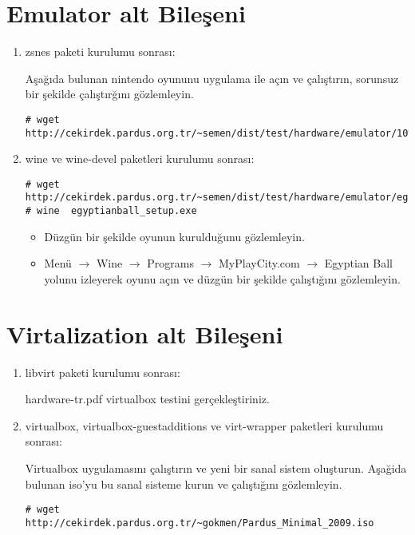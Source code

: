 \documentclass[a4paper,10pt]{article}
\begin{document}
\section{Emulator alt Bileşeni}
\begin{enumerate}
 \item zsnes paketi kurulumu sonrası:

Aşağıda bulunan nintendo oyununu uygulama ile açın ve çalıştırın, sorunsuz bir şekilde çalıştırğını gözlemleyin.
\begin{verbatim}
# wget http://cekirdek.pardus.org.tr/~semen/dist/test/hardware/emulator/10%20Yard%20Fight%20(A&S%20NES%20Hack).smc 
\end{verbatim}

 \item wine ve wine-devel paketleri kurulumu sonrası:
\begin{verbatim}
# wget http://cekirdek.pardus.org.tr/~semen/dist/test/hardware/emulator/egyptianball_setup.exe
# wine  egyptianball_setup.exe
\end{verbatim}
\begin{itemize}
 \item Düzgün bir şekilde oyunun kurulduğunu gözlemleyin.
 \item Menü $\rightarrow$ Wine $\rightarrow$ Programs $\rightarrow$ MyPlayCity.com $\rightarrow$ Egyptian Ball yolunu izleyerek oyunu açın ve düzgün bir şekilde çalıştığını gözlemleyin.
\end{itemize}

\end{enumerate}

\section{Virtalization alt Bileşeni}
\begin{enumerate}
 \item libvirt paketi kurulumu sonrası:

hardware-tr.pdf virtualbox testini gerçekleştiriniz.
 \item virtualbox, virtualbox-guestadditions ve virt-wrapper paketleri kurulumu sonrası:
 
Virtualbox uygulamasını çalıştırın ve yeni bir sanal sistem oluşturun. Aşağida bulunan iso'yu bu sanal sisteme kurun ve çalıştığını gözlemleyin.
\begin{verbatim}
# wget http://cekirdek.pardus.org.tr/~gokmen/Pardus_Minimal_2009.iso
\end{verbatim}

\end{enumerate}
\end{document}
